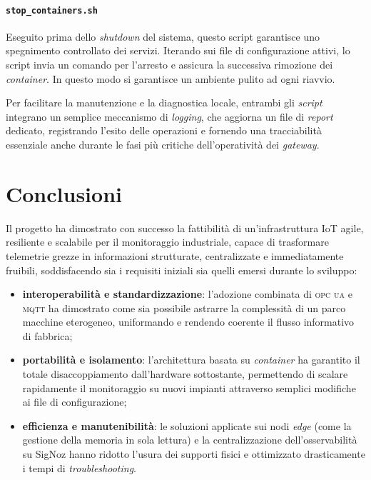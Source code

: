 \documentclass[12pt]{article}
\begin{document}
    \paragraph{\texttt{stop\_containers.sh}} 
    Eseguito prima dello \textit{shutdown} del sistema, questo script garantisce uno spegnimento controllato dei servizi. Iterando sui file di configurazione attivi, lo script invia un comando per l'arresto e assicura la successiva rimozione dei \textit{container}. In questo modo si garantisce un ambiente pulito ad ogni riavvio. \newline

    Per facilitare la manutenzione e la diagnostica locale, entrambi gli \textit{script} integrano un semplice meccanismo di \textit{logging}, che aggiorna un file di \textit{report} dedicato, registrando l'esito delle operazioni e fornendo una tracciabilità essenziale anche durante le fasi più critiche dell'operatività dei \textit{gateway}.

    \section{Conclusioni}

    Il progetto ha dimostrato con successo la fattibilità di un’infrastruttura IoT agile, resiliente e scalabile per il monitoraggio industriale, capace di trasformare telemetrie grezze in informazioni strutturate, centralizzate e immediatamente fruibili, soddisfacendo sia i requisiti iniziali sia quelli emersi durante lo sviluppo:

    
    \begin{itemize}
        \item \textbf{interoperabilità e standardizzazione}: l'adozione combinata di \textsc{opc ua} e \textsc{mqtt} ha dimostrato come sia possibile astrarre la complessità di un parco macchine eterogeneo, uniformando e rendendo coerente il flusso informativo di fabbrica;
        \item \textbf{portabilità e isolamento}: l'architettura basata su \textit{container} ha garantito il totale disaccoppiamento dall'hardware sottostante, permettendo di scalare rapidamente il monitoraggio su nuovi impianti attraverso semplici modifiche ai file di configurazione;
        \item \textbf{efficienza e manutenibilità}: le soluzioni applicate sui nodi \textit{edge} (come la gestione della memoria in sola lettura) e la centralizzazione dell'osservabilità su SigNoz hanno ridotto l'usura dei supporti fisici e ottimizzato drasticamente i tempi di \textit{troubleshooting}.
    \end{itemize}
        
\end{document}
